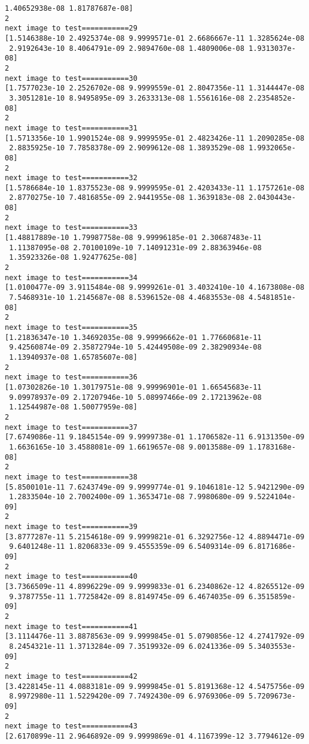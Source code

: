 \documentclass[11pt]{article}
\begin{document}
\begin{Verbatim}[commandchars=\\\{\}]
 1.40652938e-08 1.81787687e-08]
2
next image to test===========29
[1.5146388e-10 2.4925374e-08 9.9999571e-01 2.6686667e-11 1.3285624e-08
 2.9192643e-10 8.4064791e-09 2.9894760e-08 1.4809006e-08 1.9313037e-08]
2
next image to test===========30
[1.7577023e-10 2.2526702e-08 9.9999559e-01 2.8047356e-11 1.3144447e-08
 3.3051281e-10 8.9495895e-09 3.2633313e-08 1.5561616e-08 2.2354852e-08]
2
next image to test===========31
[1.5713356e-10 1.9901524e-08 9.9999595e-01 2.4823426e-11 1.2090285e-08
 2.8835925e-10 7.7858378e-09 2.9099612e-08 1.3893529e-08 1.9932065e-08]
2
next image to test===========32
[1.5786684e-10 1.8375523e-08 9.9999595e-01 2.4203433e-11 1.1757261e-08
 2.8770275e-10 7.4816855e-09 2.9441955e-08 1.3639183e-08 2.0430443e-08]
2
next image to test===========33
[1.48817889e-10 1.79987758e-08 9.99996185e-01 2.30687483e-11
 1.11387095e-08 2.70100109e-10 7.14091231e-09 2.88363946e-08
 1.35923326e-08 1.92477625e-08]
2
next image to test===========34
[1.0100477e-09 3.9115484e-08 9.9999261e-01 3.4032410e-10 4.1673808e-08
 7.5468931e-10 1.2145687e-08 8.5396152e-08 4.4683553e-08 4.5481851e-08]
2
next image to test===========35
[1.21836347e-10 1.34692035e-08 9.99996662e-01 1.77660681e-11
 9.42560874e-09 2.35872794e-10 5.42449508e-09 2.38290934e-08
 1.13940937e-08 1.65785607e-08]
2
next image to test===========36
[1.07302826e-10 1.30179751e-08 9.99996901e-01 1.66545683e-11
 9.09978937e-09 2.17207946e-10 5.08997466e-09 2.17213962e-08
 1.12544987e-08 1.50077959e-08]
2
next image to test===========37
[7.6749086e-11 9.1845154e-09 9.9999738e-01 1.1706582e-11 6.9131350e-09
 1.6636165e-10 3.4588081e-09 1.6619657e-08 9.0013588e-09 1.1783168e-08]
2
next image to test===========38
[5.8500101e-11 7.6243749e-09 9.9999774e-01 9.1046181e-12 5.9421290e-09
 1.2833504e-10 2.7002400e-09 1.3653471e-08 7.9980680e-09 9.5224104e-09]
2
next image to test===========39
[3.8777287e-11 5.2154618e-09 9.9999821e-01 6.3292756e-12 4.8894471e-09
 9.6401248e-11 1.8206833e-09 9.4555359e-09 6.5409314e-09 6.8171686e-09]
2
next image to test===========40
[3.7366509e-11 4.8996229e-09 9.9999833e-01 6.2340862e-12 4.8265512e-09
 9.3787755e-11 1.7725842e-09 8.8149745e-09 6.4674035e-09 6.3515859e-09]
2
next image to test===========41
[3.1114476e-11 3.8878563e-09 9.9999845e-01 5.0790856e-12 4.2741792e-09
 8.2454321e-11 1.3713284e-09 7.3519932e-09 6.0241336e-09 5.3403553e-09]
2
next image to test===========42
[3.4228145e-11 4.0883181e-09 9.9999845e-01 5.8191368e-12 4.5475756e-09
 8.9972980e-11 1.5229420e-09 7.7492430e-09 6.9769306e-09 5.7209673e-09]
2
next image to test===========43
[2.6170899e-11 2.9646892e-09 9.9999869e-01 4.1167399e-12 3.7794612e-09

\end{Verbatim}
\end{document}

